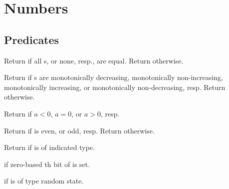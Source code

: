 \section{Numbers} 

\subsection{Predicates} 

\begin{LIST}{1cm}

  \index{=}%
  Return \retval{\T} if all s, or
  none, resp.,  are equal. Return \retval{\NIL} otherwise.

  Return \retval{\T} if s are
  monotonically decreasing, monotonically non-increasing, monotonically
  increasing, or monotonically non-decreasing, resp. Return
  \retval{\NIL} otherwise.

  Return \retval{\T} if $a < 0$, $a = 0$, or $a > 0$, resp.

   Return \retval{\T}
  if  is even, or odd, resp. Return \retval{\NIL} otherwise.

  Return \retval{\T} if  is of
  indicated type.

  \retval{\T} if zero-based th bit of  is set.

  \retval{\T} if  is of type random state.

\end{LIST}

